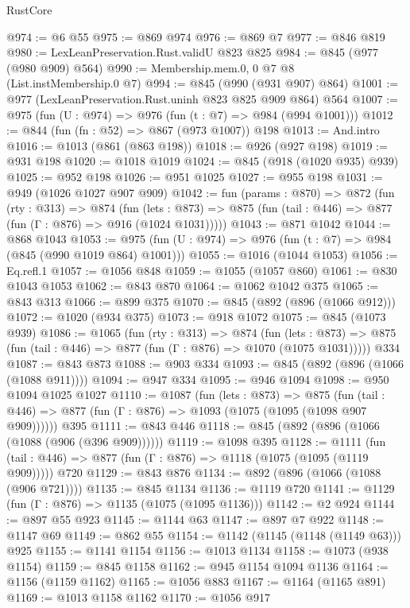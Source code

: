 \begin{lexlean}{RustCore}
\begin{coremodule}
@974 := @6 @55
@975 := @869 @974
@976 := @869 @7
@977 := @846 @819
@980 := LexLeanPreservation.Rust.validU @823 @825
@984 := @845 (@977 (@980 @909) @564)
@990 := Membership.mem.{0, 0} @7 @8 (List.instMembership.{0} @7)
@994 := @845 (@990 (@931 @907) @864)
@1001 := @977 (LexLeanPreservation.Rust.uninh @823 @825 @909 @864) @564
@1007 := @975 (fun (U : @974) => @976 (fun (t : @7) => @984 (@994 @1001)))
@1012 := @844 (fun (fn : @52) => @867 (@973 @1007)) @198
@1013 := And.intro
@1016 := @1013 (@861 (@863 @198))
@1018 := @926 (@927 @198)
@1019 := @931 @198
@1020 := @1018 @1019
@1024 := @845 (@918 (@1020 @935) @939)
@1025 := @952 @198
@1026 := @951 @1025
@1027 := @955 @198
@1031 := @949 (@1026 @1027 @907 @909)
@1042 := fun (params : @870) =>
  @872
    (fun (rty : @313) =>
    @874
      (fun (lets : @873) =>
      @875 (fun (tail : @446) => @877 (fun (Γ : @876) => @916 (@1024 @1031)))))
@1043 := @871 @1042
@1044 := @868 @1043
@1053 := @975 (fun (U : @974) => @976 (fun (t : @7) => @984 (@845 (@990 @1019 @864) @1001)))
@1055 := @1016 (@1044 @1053)
@1056 := Eq.refl.{1}
@1057 := @1056 @848
@1059 := @1055 (@1057 @860)
@1061 := @830 @1043 @1053
@1062 := @843 @870
@1064 := @1062 @1042 @375
@1065 := @843 @313
@1066 := @899 @375
@1070 := @845 (@892 (@896 (@1066 @912)))
@1072 := @1020 (@934 @375)
@1073 := @918 @1072
@1075 := @845 (@1073 @939)
@1086 := @1065
    (fun (rty : @313) =>
    @874
      (fun (lets : @873) =>
      @875 (fun (tail : @446) => @877 (fun (Γ : @876) => @1070 (@1075 @1031)))))
    @334
@1087 := @843 @873
@1088 := @903 @334
@1093 := @845 (@892 (@896 (@1066 (@1088 @911))))
@1094 := @947 @334
@1095 := @946 @1094
@1098 := @950 @1094 @1025 @1027
@1110 := @1087
    (fun (lets : @873) =>
    @875 (fun (tail : @446) => @877 (fun (Γ : @876) => @1093 (@1075 (@1095 (@1098 @907 @909))))))
    @395
@1111 := @843 @446
@1118 := @845 (@892 (@896 (@1066 (@1088 (@906 (@396 @909))))))
@1119 := @1098 @395
@1128 := @1111
    (fun (tail : @446) => @877 (fun (Γ : @876) => @1118 (@1075 (@1095 (@1119 @909)))))
    @720
@1129 := @843 @876
@1134 := @892 (@896 (@1066 (@1088 (@906 @721))))
@1135 := @845 @1134
@1136 := @1119 @720
@1141 := @1129 (fun (Γ : @876) => @1135 (@1075 (@1095 @1136)))
@1142 := @2 @924
@1144 := @897 @55 @923
@1145 := @1144 @63
@1147 := @897 @7 @922
@1148 := @1147 @69
@1149 := @862 @55
@1154 := @1142 (@1145 (@1148 (@1149 @63))) @925
@1155 := @1141 @1154
@1156 := @1013 @1134
@1158 := @1073 (@938 @1154)
@1159 := @845 @1158
@1162 := @945 @1154 @1094 @1136
@1164 := @1156 (@1159 @1162)
@1165 := @1056 @883
@1167 := @1164 (@1165 @891)
@1169 := @1013 @1158 @1162
@1170 := @1056 @917

\end{coremodule}
\end{lexlean}

